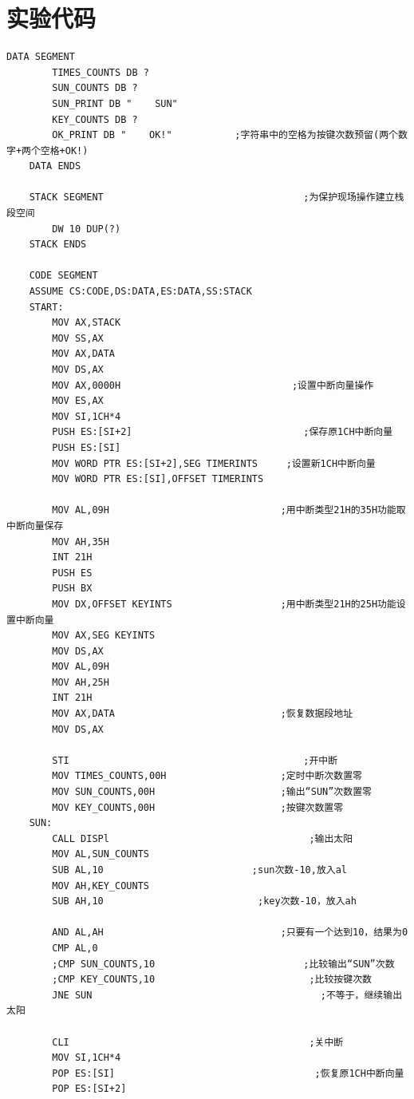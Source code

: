 \documentclass[11pt]{SEU-Digital-Report}
\begin{document}
\section{实验代码}
\begin{lstlisting}[language={[x86masm]Assembler},title=code]
    DATA SEGMENT
        TIMES_COUNTS DB ?
        SUN_COUNTS DB ?
        SUN_PRINT DB "    SUN"
        KEY_COUNTS DB ?
        OK_PRINT DB "    OK!"           ;字符串中的空格为按键次数预留(两个数字+两个空格+OK!)
    DATA ENDS

    STACK SEGMENT                                   ;为保护现场操作建立栈段空间
        DW 10 DUP(?)
    STACK ENDS

    CODE SEGMENT
    ASSUME CS:CODE,DS:DATA,ES:DATA,SS:STACK
    START:
        MOV AX,STACK
        MOV SS,AX
        MOV AX,DATA
        MOV DS,AX
        MOV AX,0000H                              ;设置中断向量操作
        MOV ES,AX
        MOV SI,1CH*4
        PUSH ES:[SI+2]                              ;保存原1CH中断向量
        PUSH ES:[SI]
        MOV WORD PTR ES:[SI+2],SEG TIMERINTS     ;设置新1CH中断向量
        MOV WORD PTR ES:[SI],OFFSET TIMERINTS

        MOV AL,09H                              ;用中断类型21H的35H功能取中断向量保存
        MOV AH,35H
        INT 21H
        PUSH ES
        PUSH BX
        MOV DX,OFFSET KEYINTS                   ;用中断类型21H的25H功能设置中断向量
        MOV AX,SEG KEYINTS
        MOV DS,AX
        MOV AL,09H
        MOV AH,25H
        INT 21H
        MOV AX,DATA                             ;恢复数据段地址
        MOV DS,AX

        STI                                         ;开中断
        MOV TIMES_COUNTS,00H                    ;定时中断次数置零
        MOV SUN_COUNTS,00H                      ;输出“SUN”次数置零
        MOV KEY_COUNTS,00H                      ;按键次数置零
    SUN:
        CALL DISPl                                   ;输出太阳
        MOV AL,SUN_COUNTS   
        SUB AL,10                          ;sun次数-10,放入al 
        MOV AH,KEY_COUNTS
        SUB AH,10                           ;key次数-10，放入ah

        AND AL,AH                               ;只要有一个达到10，结果为0
        CMP AL,0
        ;CMP SUN_COUNTS,10                          ;比较输出“SUN”次数
        ;CMP KEY_COUNTS,10                           ;比较按键次数
        JNE SUN                                        ;不等于，继续输出太阳

        CLI                                          ;关中断
        MOV SI,1CH*4          
        POP ES:[SI]                                   ;恢复原1CH中断向量
        POP ES:[SI+2]


\end{lstlisting}
\end{document}
